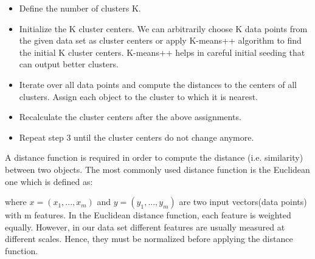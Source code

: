 \begin{itemize}
	\item Define the number of clusters K.
	
	\item Initialize the K cluster centers. We can arbitrarily choose K data points from the given data set as cluster centers or apply K-means++ \cite{arthur2007k} algorithm to find the initial K cluster centers. K-means++ helps in careful initial seeding that can output better clusters.
	
	\item Iterate over all data points and compute the distances to the centers of all clusters. Assign each object to the cluster to which it is nearest.
	
	\item Recalculate the cluster centers after the above assignments.
	
	\item Repeat step 3 until the cluster centers do not change anymore.
\end{itemize}

A distance function is required in order to compute the
distance (i.e. similarity) between two objects. The most commonly used distance function is the Euclidean one which is defined as:

\begin{center}
\end{center}
where $x = (x_1, ..., x_m)$ and $y = (y_1, ..., y_m)$ are two input vectors(data points) with m features. In the Euclidean distance function, each feature is weighted equally. However, in our data set different features are usually measured at different scales. Hence, they must be normalized before applying the distance function.
